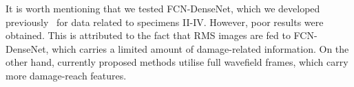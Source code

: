 \begin{sloppypar}
	
	It is worth mentioning that we tested FCN-DenseNet, which we developed previously~\cite{Ijjeh2021} for data related to specimens II-IV. 
	However, poor results were obtained. 
	This is attributed to the fact that RMS images are fed to FCN-DenseNet, which carries a limited amount of damage-related information. 
	On the other hand, currently proposed methods utilise full wavefield frames, which carry more damage-reach features. 
		

\end{sloppypar}
